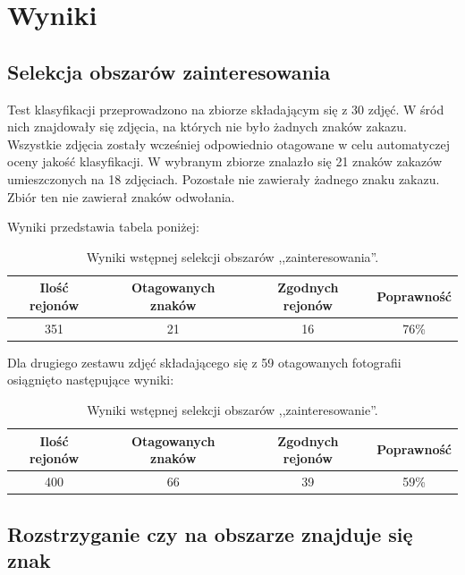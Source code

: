 \documentclass{classrep}
\begin{document}
\section{Wyniki}
\subsection{Selekcja obszarów zainteresowania}
Test klasyfikacji przeprowadzono na zbiorze składającym się z 30 zdjęć. W śród nich znajdowały się zdjęcia, na których nie było żadnych znaków zakazu. Wszystkie zdjęcia zostały wcześniej odpowiednio otagowane w celu automatyczej oceny jakość klasyfikacji. W wybranym zbiorze znalazło się 21 znaków zakazów umieszczonych na 18 zdjęciach. Pozostałe nie zawierały żadnego znaku zakazu. Zbiór ten nie zawierał znaków odwołania.

Wyniki przedstawia tabela poniżej:
\begin{table}[H]
\centering
\begin{tabular}{|c|c|c|c|}
\hline 
Ilość rejonów &  Otagowanych znaków & Zgodnych rejonów &  Poprawność \\
\hline
351   &   21   &   16   &  76\% \\
\hline 
\end{tabular} 
\caption{Wyniki wstępnej selekcji obszarów ,,zainteresowania''.}
\label{wyniki:preproc}
\end{table}

Dla drugiego zestawu zdjęć składającego się z 59 otagowanych fotografii osiągnięto następujące wyniki:
\begin{table}[H]
\centering
\begin{tabular}{|c|c|c|c|}
\hline 
Ilość rejonów &  Otagowanych znaków & Zgodnych rejonów &  Poprawność \\
\hline
400   &   66   &   39   &  59\% \\
\hline 
\end{tabular} 
\caption{Wyniki wstępnej selekcji obszarów ,,zainteresowanie''.}
\label{wyniki:preproc2}
\end{table}

\subsection{Rozstrzyganie czy na obszarze znajduje się znak}
\end{document}
